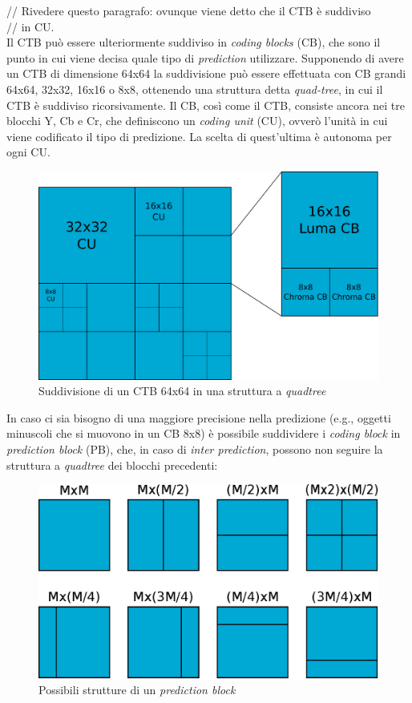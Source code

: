 // Rivedere questo paragrafo: ovunque viene detto che il CTB è suddiviso \\
// in CU. \\
Il CTB può essere ulteriormente suddiviso in \emph{coding blocks} (CB), che 
sono il punto in cui viene decisa quale tipo di \emph{prediction} utilizzare.
Supponendo di avere un CTB di dimensione 64x64 la suddivisione può essere 
effettuata con CB grandi 64x64, 32x32, 16x16 o 8x8, ottenendo una struttura
detta \emph{quad-tree}, in cui il CTB è suddiviso ricorsivamente. 
Il CB, così come il CTB, consiste ancora nei tre blocchi Y, Cb e 
Cr, che definiscono un \emph{coding unit} (CU), ovverò l'unità in cui viene 
codificato il tipo di predizione. La scelta di quest'ultima è autonoma per ogni 
CU.
\begin{figure}[H]
  \centering
  \includegraphics[scale=0.50]{Figures/CTB-CU-CB}
  \caption[Suddivisione del CTB in CU]{Suddivisione di un CTB 64x64 in una 
struttura a \emph{quadtree}}
\end{figure}
In caso ci sia bisogno di una maggiore precisione nella predizione (e.g., 
oggetti minuscoli che si muovono in un CB 8x8) è possibile suddividere i
\emph{coding block} in \emph{prediction block} (PB), che, in caso di 
\emph{inter prediction}, possono non seguire la struttura a \emph{quadtree} dei
blocchi precedenti:
\begin{figure}[H]
  \centering
  \includegraphics[scale=0.50]{Figures/PB}
  \caption{Possibili strutture di un \emph{prediction block}}
\end{figure}
